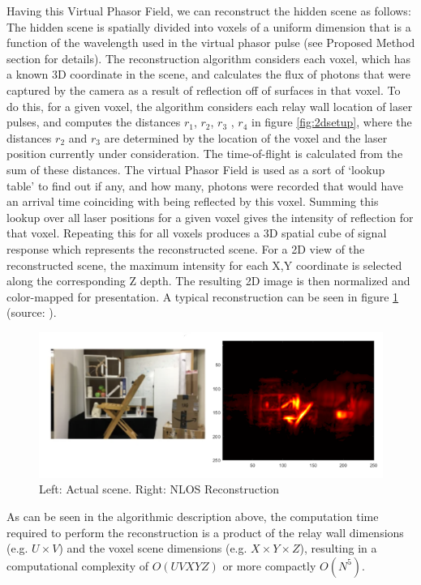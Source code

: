 \documentclass[conference]{IEEEtran}
\begin{document}
Having this Virtual Phasor Field, we can reconstruct the hidden scene as follows: The hidden scene is spatially divided into voxels of a uniform dimension that is a function of the wavelength used in the virtual phasor pulse (see Proposed Method section for details). The reconstruction algorithm considers each voxel, which has a known 3D coordinate in the scene, and calculates the flux of photons that were captured by the camera as a result of reflection off of surfaces in that voxel. To do this, for a given voxel, the algorithm considers each relay wall location of laser pulses, and computes the distances $r_1$, $r_2$, $r_3$ , $r_4$ in figure \ref{fig:2dsetup}, where the distances $r_2$ and $r_3$ are determined by the location of the voxel and the laser position currently under consideration. The time-of-flight is calculated from the sum of these distances. The virtual Phasor Field is used as a sort of `lookup table' to find out if any, and how many, photons were recorded that would have an arrival time coinciding with being reflected by this voxel. Summing this lookup over all laser positions for a given voxel gives the intensity of reflection for that voxel. Repeating this for all voxels produces a 3D spatial cube of signal response which represents the reconstructed scene. For a 2D view of the reconstructed scene, the maximum intensity for each X,Y coordinate is selected along the corresponding Z depth. The resulting 2D image is then normalized and color-mapped for presentation. A typical reconstruction can be seen in figure \ref{fig:typscene} (source: \cite{Liu2019}).

\begin{figure}
    \centering
    \includegraphics[width=\columnwidth]{figures/typscene.png}
    \caption{Left: Actual scene.  Right: NLOS Reconstruction}
    \label{fig:typscene}
\end{figure}

As can be seen in the algorithmic description above, the computation time required to perform the reconstruction is a product of the relay wall dimensions (e.g. $U \times V$) and the voxel scene dimensions (e.g. $X \times Y \times Z$), resulting in a computational complexity of $O(UVXYZ)$ or more compactly $O(N^5)$.
\end{document}
